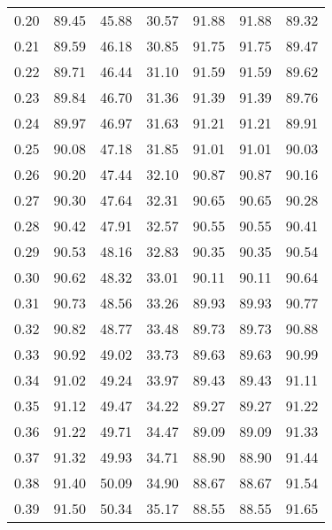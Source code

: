 \begin{tabular}{|c|c|c|c|c|c|c|}
      0.20 &     89.45 &     45.88 &      30.57 &   91.88 &      91.88 &         89.32 \\
      0.21 &     89.59 &     46.18 &      30.85 &   91.75 &      91.75 &         89.47 \\
      0.22 &     89.71 &     46.44 &      31.10 &   91.59 &      91.59 &         89.62 \\
      0.23 &     89.84 &     46.70 &      31.36 &   91.39 &      91.39 &         89.76 \\
      0.24 &     89.97 &     46.97 &      31.63 &   91.21 &      91.21 &         89.91 \\
      0.25 &     90.08 &     47.18 &      31.85 &   91.01 &      91.01 &         90.03 \\
      0.26 &     90.20 &     47.44 &      32.10 &   90.87 &      90.87 &         90.16 \\
      0.27 &     90.30 &     47.64 &      32.31 &   90.65 &      90.65 &         90.28 \\
      0.28 &     90.42 &     47.91 &      32.57 &   90.55 &      90.55 &         90.41 \\
      0.29 &     90.53 &     48.16 &      32.83 &   90.35 &      90.35 &         90.54 \\
      0.30 &     90.62 &     48.32 &      33.01 &   90.11 &      90.11 &         90.64 \\
      0.31 &     90.73 &     48.56 &      33.26 &   89.93 &      89.93 &         90.77 \\
      0.32 &     90.82 &     48.77 &      33.48 &   89.73 &      89.73 &         90.88 \\
      0.33 &     90.92 &     49.02 &      33.73 &   89.63 &      89.63 &         90.99 \\
      0.34 &     91.02 &     49.24 &      33.97 &   89.43 &      89.43 &         91.11 \\
      0.35 &     91.12 &     49.47 &      34.22 &   89.27 &      89.27 &         91.22 \\
      0.36 &     91.22 &     49.71 &      34.47 &   89.09 &      89.09 &         91.33 \\
      0.37 &     91.32 &     49.93 &      34.71 &   88.90 &      88.90 &         91.44 \\
      0.38 &     91.40 &     50.09 &      34.90 &   88.67 &      88.67 &         91.54 \\
      0.39 &     91.50 &     50.34 &      35.17 &   88.55 &      88.55 &         91.65 \\

\end{tabular}
